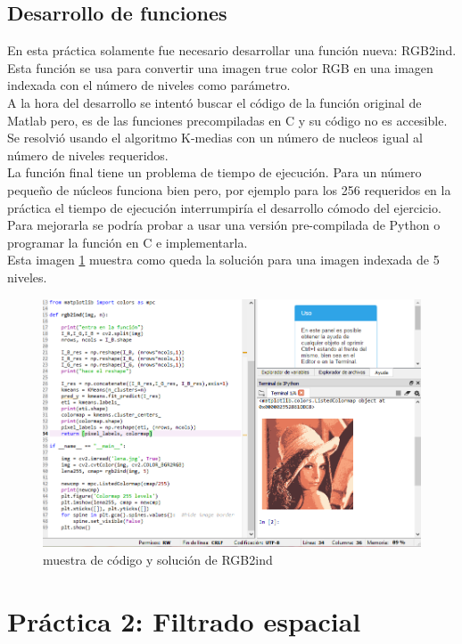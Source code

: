 \documentclass[a4paper,12pt]{report}
\begin{document}
\subsection{Desarrollo de funciones}

En esta práctica solamente fue necesario desarrollar una función nueva: RGB2ind. Esta función se usa para convertir una imagen true color RGB en una imagen indexada con el número de niveles como parámetro. \\

A la hora del desarrollo se intentó buscar el código de la función original de Matlab pero, es de las funciones precompiladas en C y su código no es accesible. Se resolvió usando el algoritmo K-medias con un número de nucleos igual al número de niveles requeridos.\\

 La función final tiene un problema de tiempo de ejecución. Para un número pequeño de núcleos funciona bien pero, por ejemplo para los 256 requeridos en la práctica el tiempo de ejecución interrumpiría el desarrollo cómodo del ejercicio. Para mejorarla se podría probar a usar una versión pre-compilada de Python o programar la función en C e implementarla.\\

Esta imagen \ref{rgb2ind} muestra como queda la solución para una imagen indexada de 5 niveles.
\begin{figure}[h]
\centering
\includegraphics[width=1\textwidth]{imagenes/rgb2ind}
\caption{muestra de código y solución de RGB2ind}
\label{rgb2ind}
\end{figure}


\section{ Práctica 2: Filtrado espacial}
\end{document}
